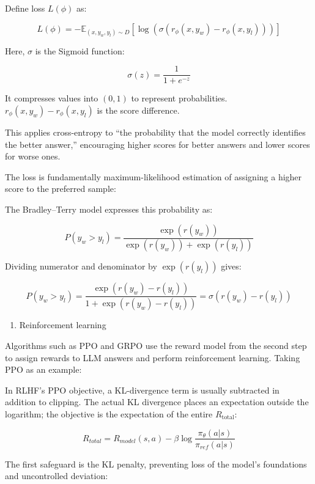 Define loss \(L(\phi)\) as:

\[
L(\phi)=-\mathbb{E}_{(x,y_w,y_l)\sim D}\left[\log\left(\sigma\left(r_\phi(x,y_w)-r_\phi(x,y_l)\right)\right)\right]
\]

Here, \(\sigma\) is the Sigmoid function:

\[
\sigma(z)=\frac{1}{1+e^{-z}}
\]

It compresses values into \((0,1)\) to represent probabilities. \(r_\phi(x,y_w)-r_\phi(x,y_l)\) is the score difference.

This applies cross-entropy to ``the probability that the model correctly identifies the better answer,'' encouraging higher scores for better answers and lower scores for worse ones.

The loss is fundamentally maximum-likelihood estimation of assigning a higher score to the preferred sample:

The Bradley--Terry model expresses this probability as:

\[
P(y_w>y_l)=\frac{\exp(r(y_w))}{\exp(r(y_w))+\exp(r(y_l))}
\]

Dividing numerator and denominator by \(\exp(r(y_l))\) gives:

\[
P(y_w>y_l)=\frac{\exp(r(y_w)-r(y_l))}{1+\exp(r(y_w)-r(y_l))}=\sigma(r(y_w)-r(y_l))
\]

\begin{enumerate}
\def\labelenumi{\arabic{enumi}.}
\setcounter{enumi}{1}
\tightlist
\item
  Reinforcement learning
\end{enumerate}

Algorithms such as PPO and GRPO use the reward model from the second step to assign rewards to LLM answers and perform reinforcement learning. Taking PPO as an example:

In RLHF's PPO objective, a KL-divergence term is usually subtracted in addition to clipping. The actual KL divergence places an expectation outside the logarithm; the objective is the expectation of the entire \(R_{\mathrm{total}}\):

\[
R_{total}=R_{model}(s,a)-\beta\log\frac{\pi_\theta(a|s)}{\pi_{ref}(a|s)}
\]

The first safeguard is the KL penalty, preventing loss of the model's foundations and uncontrolled deviation:

